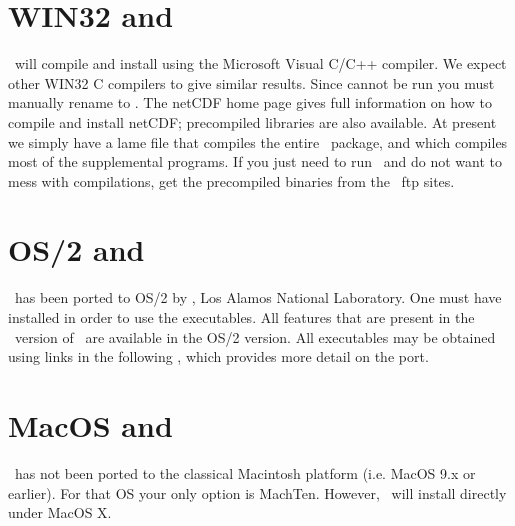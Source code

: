 \section{WIN32 and \gmt}

\GMT\ will compile and install using the Microsoft Visual C/C++
compiler.  We expect other WIN32 C compilers to give similar
results.  Since  cannot be run you
must manually rename  to
.  The netCDF home page gives full
information on how to compile and install netCDF; precompiled
libraries are also available.  At present we simply have a lame 
file that compiles the entire \GMT\
package, and  which compiles most of the
supplemental programs.  If you just need to run \GMT\ and do not want to mess with compilations,
get the precompiled binaries from the \GMT\ ftp sites.


\section{OS/2 and \gmt}

\GMT\ has been ported to OS/2 by ,
Los Alamos National Laboratory.
One must have 
installed in order to use the executables.  All features 
that are present in the \UNIX\ version of \GMT\ are available in the OS/2 version.
All executables may be obtained using links in the following
,
which provides more detail on the port.

\section{MacOS and \gmt}

\GMT\ has not been ported to the classical Macintosh platform
(i.e. MacOS 9.x or earlier).  For that OS your only option is MachTen.
However, \GMT\ will install directly under MacOS X.

